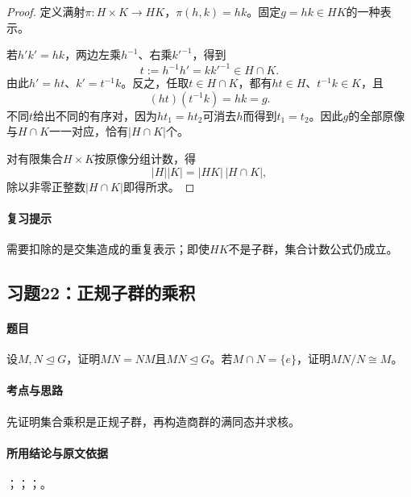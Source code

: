 \begin{proof}
定义满射$\pi:H\times K\to HK$，$\pi(h,k)=hk$。固定$g=hk\in HK$的一种表示。

若$h'k'=hk$，两边左乘$h^{-1}$、右乘$k'^{-1}$，得到
\[
t:=h^{-1}h'=kk'^{-1}\in H\cap K.
\]
由此$h'=ht$、$k'=t^{-1}k$。反之，任取$t\in H\cap K$，都有$ht\in H$、$t^{-1}k\in K$，且
\[
(ht)(t^{-1}k)=hk=g.
\]
不同$t$给出不同的有序对，因为$ht_1=ht_2$可消去$h$而得到$t_1=t_2$。因此$g$的全部原像与$H\cap K$一一对应，恰有$|H\cap K|$个。

对有限集合$H\times K$按原像分组计数，得
\[
|H||K|=|HK|\,|H\cap K|,
\]
除以非零正整数$|H\cap K|$即得所求。
\end{proof}

\paragraph{复习提示}
需要扣除的是交集造成的重复表示；即使$HK$不是子群，集合计数公式仍成立。


\subsection{习题22：\texorpdfstring{正规子群的乘积}{正规子群的乘积}}
\label{ex:1:22}

\paragraph{题目}
设$M,N\trianglelefteq G$，证明$MN=NM$且$MN\trianglelefteq G$。若$M\cap N=\{e\}$，证明$MN/N\cong M$。

\paragraph{考点与思路}
先证明集合乘积是正规子群，再构造商群的满同态并求核。

\paragraph{所用结论与原文依据}
；；；。


